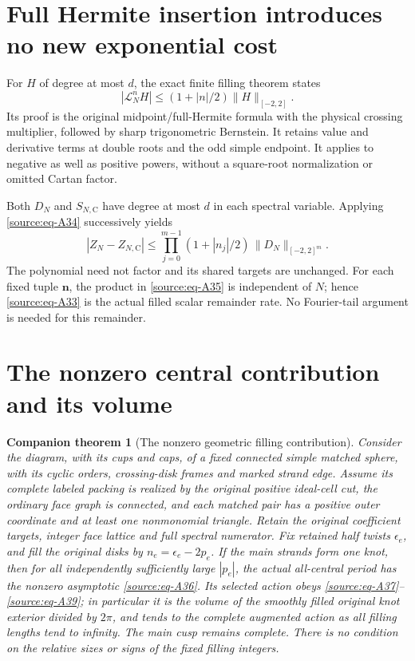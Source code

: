 \documentclass[11pt]{article}
\numberwithin{equation}{section}
\newtheorem{foundation}{Companion theorem}
\begin{document}
\section{Full Hermite insertion introduces no new exponential
cost}\label{source:sec-7}

For \(H\) of degree at most \(d\), the exact finite filling theorem
states \begin{equation}\label{source:eq-A34}
|\mathcal L_N^n H|\le(1+|n|/2)\|H\|_{[-2,2]}.
\end{equation} Its proof is the original midpoint/full-Hermite formula with the
physical crossing multiplier, followed by sharp trigonometric Bernstein.
It retains value and derivative terms at double roots and the odd simple
endpoint. It applies to negative as well as positive powers, without a
square-root normalization or omitted Cartan factor.

Both \(D_N\) and \(S_{N,\mathrm C}\) have degree at most \(d\) in each
spectral variable. Applying \eqref{source:eq-A34} successively yields \begin{equation}\label{source:eq-A35}
|Z_N-Z_{N,\mathrm C}|
 \le\prod_{j=0}^{m-1}(1+|n_j|/2)\,
                     \|D_N\|_{[-2,2]^m}.
\end{equation} The polynomial need not factor and its shared targets are unchanged.
For each fixed tuple \(\mathbf n\), the product in \eqref{source:eq-A35} is independent of
\(N\); hence \eqref{source:eq-A33} is the actual filled scalar remainder rate. No
Fourier-tail argument is needed for this remainder.

\section{The nonzero central contribution and its volume}\label{source:sec-8}


\begin{foundation}[The nonzero geometric filling contribution]\label{found:period}
Consider the diagram, with its cups and caps, of a fixed connected simple
matched sphere, with its cyclic orders, crossing-disk frames and marked
strand edge. Assume its complete labeled packing is realized by the
original positive ideal-cell cut, the ordinary face graph is connected,
and each matched pair has a positive outer coordinate and at least one
nonmonomial triangle. Retain the original coefficient targets, integer
face lattice and full spectral numerator. Fix retained half twists
\(\epsilon_e\), and fill the original disks by
\(n_e=\epsilon_e-2p_e\). If the main strands form one knot, then for
all independently sufficiently large \(|p_e|\), the actual all-central
period has the nonzero asymptotic \eqref{source:eq-A36}. Its selected
action obeys \eqref{source:eq-A37}--\eqref{source:eq-A39}; in particular
it is the volume of the smoothly filled original knot exterior divided
by \(2\pi\), and tends to the complete augmented action as all filling
lengths tend to infinity. The main cusp remains complete. There is no
condition on the relative sizes or signs of the fixed filling integers.
\end{foundation}
\end{document}
